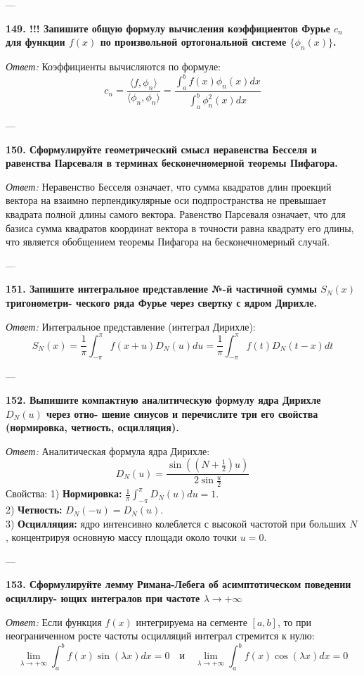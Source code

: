 \documentclass{article}
\begin{document}
---

\textbf{149. !!! Запишите общую формулу вычисления коэффициентов Фурье $c_{n}$ для функции $f(x)$ по произвольной ортогональной системе $\{\phi_{n}(x)\}$.}

\textit{Ответ:} Коэффициенты вычисляются по формуле:
$$ c_n = \frac{\langle f, \phi_n \rangle}{\langle \phi_n, \phi_n \rangle} = \frac{\int_a^b f(x)\phi_n(x)dx}{\int_a^b \phi_n^2(x)dx} $$

---

\textbf{150. Сформулируйте геометрический смысл неравенства Бесселя и равенства Парсеваля в терминах бесконечномерной теоремы Пифагора.}

\textit{Ответ:} Неравенство Бесселя означает, что сумма квадратов длин проекций вектора на взаимно перпендикулярные оси подпространства не превышает квадрата полной длины самого вектора. Равенство Парсеваля означает, что для базиса сумма квадратов координат вектора в точности равна квадрату его длины, что является обобщением теоремы Пифагора на бесконечномерный случай.

---

\textbf{151. Запишите интегральное представление №-й частичной суммы $S_{N}(x)$ тригонометри- ческого ряда Фурье через свертку с ядром Дирихле.}

\textit{Ответ:} Интегральное представление (интеграл Дирихле):
$$ S_N(x) = \frac{1}{\pi} \int_{-\pi}^{\pi} f(x+u)D_N(u)du = \frac{1}{\pi} \int_{-\pi}^{\pi} f(t)D_N(t-x)dt $$

---

\textbf{152. Выпишите компактную аналитическую формулу ядра Дирихле $D_{N}(u)$ через отно- шение синусов и перечислите три его свойства (нормировка, четность, осцилляция).}

\textit{Ответ:} Аналитическая формула ядра Дирихле:
$$ D_N(u) = \frac{\sin\left((N+\frac{1}{2})u\right)}{2\sin\frac{u}{2}} $$
Свойства:
1) \textbf{Нормировка:} $\frac{1}{\pi}\int_{-\pi}^{\pi} D_N(u) du = 1$. \\
2) \textbf{Четность:} $D_N(-u) = D_N(u)$. \\
3) \textbf{Осцилляция:} ядро интенсивно колеблется с высокой частотой при больших $N$, концентрируя основную массу площади около точки $u=0$.

---

\textbf{153. Сформулируйте лемму Римана-Лебега об асимптотическом поведении осциллиру- ющих интегралов при частоте $\lambda\rightarrow+\infty$}

\textit{Ответ:} Если функция $f(x)$ интегрируема на сегменте $[a, b]$, то при неограниченном росте частоты осцилляций интеграл стремится к нулю:
$$ \lim_{\lambda \to +\infty} \int_a^b f(x) \sin(\lambda x) dx = 0 \quad \text{и} \quad \lim_{\lambda \to +\infty} \int_a^b f(x) \cos(\lambda x) dx = 0 $$
\end{document}
